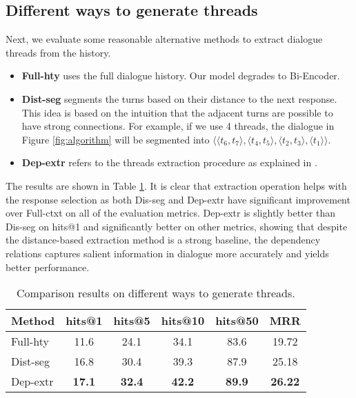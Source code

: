 \subsection{Different ways to generate threads}
\label{sec:ways}
Next, we evaluate some reasonable alternative methods to extract dialogue threads
from the history. 
\begin{itemize}
	\item \textbf{Full-hty} uses the full dialogue history. 
Our model degrades to Bi-Encoder.
	\item \textbf{Dist-seg} segments the turns based on their distance to the next response. This idea is based on the intuition that the adjacent turns are possible to have strong connections. For example, if we use 4 threads, the dialogue in Figure \ref{fig:algorithm} will be segmented into $\langle\langle t_6, t_7\rangle, \langle t_4, t_5\rangle, \langle t_2, t_3\rangle, \langle t_1\rangle\rangle$.
	\item \textbf{Dep-extr} refers to the threads extraction procedure as explained in . %
\end{itemize}

The results are shown in Table \ref{tab:abl_way}. It is clear that extraction operation 
helps with the response selection as both Dis-seg and Dep-extr have significant 
improvement over Full-ctxt on all of the evaluation metrics. 
Dep-extr is slightly better than Dis-seg on hits@1 and significantly better on other metrics, 
showing that despite the distance-based extraction method is a strong baseline, 
the dependency relations captures salient information in dialogue more accurately and 
yields better performance.
\begin{table}[th]
	\centering
	\scriptsize
	\begin{tabular}{lccccc}
		\toprule[1pt]
		Method &  hits@1 & hits@5 &hits@10 & hits@50 & MRR \\
		\midrule[1pt]
		Full-hty &11.6 & 24.1 & 34.1 & 83.6 & 19.72 \\
		Dist-seg & 16.8 & 30.4 & 39.3 & 87.9 & 25.18 \\
		Dep-extr & \bf 17.1 & \bf 32.4 & \bf 42.2 & \bf 89.9 & \bf 26.22 \\
		\bottomrule[1pt]
	\end{tabular}
	\caption{Comparison results on different ways to generate threads.}
	\label{tab:abl_way}
\end{table}

